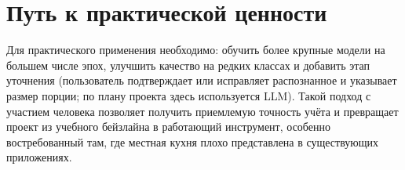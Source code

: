 \documentclass[11pt,a4paper]{article}
\begin{document}
\section{Путь к практической ценности}
Для практического применения необходимо: обучить более крупные модели на большем числе
эпох, улучшить качество на редких классах и добавить этап уточнения (пользователь
подтверждает или исправляет распознанное и указывает размер порции; по плану проекта
здесь используется LLM). Такой подход с участием человека позволяет получить
приемлемую точность учёта и превращает проект из учебного бейзлайна в работающий
инструмент, особенно востребованный там, где местная кухня плохо представлена в
существующих приложениях.
\end{document}
